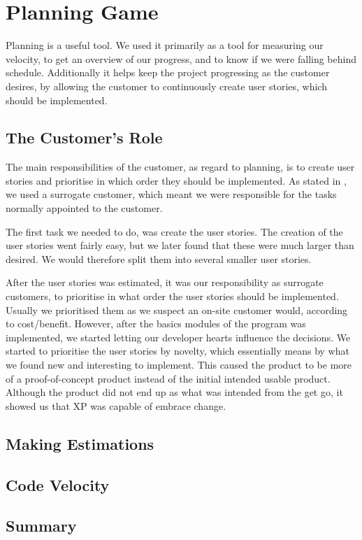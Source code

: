 \section{Planning Game}
Planning is a useful tool.
We used it primarily as a tool for measuring our velocity, to get an overview of our progress, and to know if we were falling behind schedule.
Additionally it helps keep the project progressing as the customer desires, by allowing the customer to continuously create user stories, which should be implemented.

\subsection{The Customer's Role}
The main responsibilities of the customer, as regard to planning, is to create user stories and prioritise in which order they should be implemented.
As stated in , we used a surrogate customer, which meant we were responsible for the tasks normally appointed to the customer.

The first task we needed to do, was create the user stories.
The creation of the user stories went fairly easy, but we later found that these were much larger than desired.
We would therefore split them into several smaller user stories.

After the user stories was estimated, it was our responsibility as surrogate customers, to prioritise in what order the user stories should be implemented.
Usually we prioritised them as we suspect an on-site customer would, according to cost/benefit.
However, after the basics modules of the program was implemented, we started letting our developer hearts influence the decisions.
We started to prioritise the user stories by novelty, which essentially means by what we found new and interesting to implement.
This caused the product to be more of a proof-of-concept product instead of the initial intended usable product.
Although the product did not end up as what was intended from the get go, it showed us that XP was capable of embrace change.


\subsection{Making Estimations}

\subsection{Code Velocity}

\subsection{Summary}
